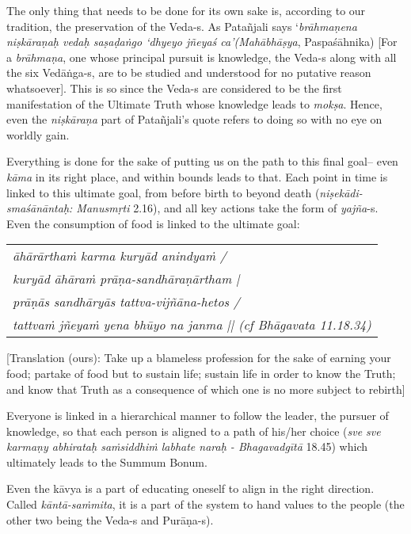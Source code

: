 The only thing that needs to be done for its own sake is, according to our tradition, the preservation of the Veda-s. As Patañjali says ‘{\sl brāhmaṇena niṣkāraṇaḥ vedaḥ saṣaḍaṅgo ‘dhyeyo jñeyaś ca’(Mahābhāṣya}, Paspaśāhnika) [For a {\sl brāhmaṇa}, one whose principal pursuit is knowledge, the Veda-s along with all the six Vedāṅga-s, are to be studied and understood for no putative reason whatsoever]. This is so since the Veda-s are considered to be the first manifestation of the Ultimate Truth whose knowledge leads to {\sl mokṣa}. Hence, even the {\sl niṣkāraṇa} part of Patañjali’s quote refers to doing so with no eye on worldly gain.

Everything is done for the sake of putting us on the path to this final goal– even {\sl kāma} in its right place, and within bounds leads to that. Each point in time is linked to this ultimate goal, from before birth to beyond death ({\sl niṣekādi-smaśānāntaḥ: Manusmṛti} 2.16), and all key actions take the form of {\sl yajña}-s. Even the consumption of food is linked to the ultimate goal:  
\begin{center}
\begin{tabular}{>{\sl}l}
āhārārthaṁ karma kuryād anindyaṁ / \\
kuryād āhāraṁ prāṇa-sandhāraṇārtham | \\
prāṇās sandhāryās tattva-vijñāna-hetos / \\
tattvaṁ jñeyaṁ yena bhūyo na janma || (cf Bhāgavata\index{Bhāgavata} {\rm 11.18.34}) 
\end{tabular}
\end{center}
[Translation (ours): Take up a blameless profession  for the sake of earning your food; partake of food but to sustain life; sustain life in order to know the Truth; and know that Truth as a consequence of which one is no more subject to rebirth]

Everyone is linked in a hierarchical manner to follow the leader, the pursuer of knowledge, so that each person is aligned to a path of his/her choice ({\sl sve sve karmaṇy abhirataḥ saṁsiddhiṁ labhate naraḥ - Bhagavadgītā} 18.45) which ultimately leads to the Summum Bonum. 

Even the kāvya is a part of educating oneself to align in the right direction. Called {\sl kāntā-saṁmita}, it is a part of the system to hand values to the people (the other two being the Veda-s and Purāṇa-s).
\vskip -40pt

